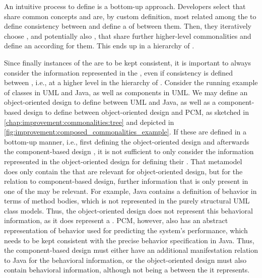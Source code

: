An intuitive process to define \commonalities is a bottom-up approach.
Developers select \concretemetamodels that share common concepts and are, by custom definition, most related among the \concretemetamodels to define consistency between and define a \conceptmetamodel of \commonalities between them.
Then, they iteratively choose \conceptmetamodels, and potentially also \concretemetamodels, that share further higher-level commonalities and define an according \conceptmetamodel for them.
This ends up in a hierarchy of \conceptmetamodels.

Since finally instances of the \concretemetamodels are to be kept consistent, it is important to always consider the information represented in the \concretemetamodels, even if consistency is defined between \conceptmetamodels, i.e., at a higher level in the hierarchy of \conceptmetamodels.
Consider the running example of classes in \gls{UML} and Java, as well as components in \gls{UML}.
We may define an object-oriented design \conceptmetamodel to define \commonalities between \gls{UML} and Java, as well as a component-based design \conceptmetamodel to define \commonalities between object-oriented design and \gls{PCM}, as sketched in \autoref{chap:improvement:commonalities:tree} and depicted in \autoref{fig:improvement:composed_commonalities_example}.
If these \conceptmetamodels are defined in a bottom-up manner, i.e., first defining the object-oriented design \conceptmetamodel and afterwards the component-based design \conceptmetamodels, it is not sufficient to only consider the information represented in the object-oriented design \conceptmetamodels for defining their \commonalities.
That metamodel does only contain the \commonalities that are relevant for object-oriented design, but for the relation to component-based design, further information that is only present in one of the \concretemetamodels may be relevant.
For example, Java contains a definition of behavior in terms of method bodies, which is not represented in the purely structural \gls{UML} class models.
Thus, the object-oriented design \conceptmetamodel does not represent this behavioral information, as it does represent a \commonality.
\gls{PCM}, however, also has an abstract representation of behavior used for predicting the system's performance, which needs to be kept consistent with the precise behavior specification in Java.
Thus, the component-based design \conceptmetamodel must either have an additional manifestation relation to Java for the behavioral information, or the object-oriented design \conceptmetamodel must also contain behavioral information, although not being a \commonality between the \concretemetamodels it represents.

